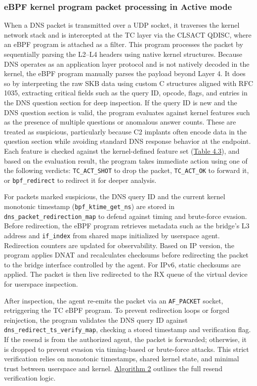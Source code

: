 \documentclass [11pt, proquest] {uwthesis}[2020/02/24]
\begin{document}
\subsubsection{\textbf{eBPF kernel program packet processing in \textbf{Active} mode}}
\label{active:sec1}
When a DNS packet is transmitted over a UDP socket, it traverses the kernel network stack and is intercepted at the TC layer via the CLSACT QDISC, where an eBPF program is attached as a filter. This program processes the packet by sequentially parsing the L2–L4 headers using native kernel structures. Because DNS operates as an application layer protocol and is not natively decoded in the kernel, the eBPF program manually parses the payload beyond Layer 4. It does so by interpreting the raw SKB data using custom C structures aligned with RFC 1035, extracting critical fields such as the query ID, opcode, flags, and entries in the DNS question section for deep inspection.
If the query ID is new and the DNS question section is valid, the program evaluates against kernel features such as the presence of multiple questions or anomalous answer counts. These are treated as suspicious, particularly because C2 implants often encode data in the question section while avoiding standard DNS response behavior at the endpoint. Each feature is checked against the kernel-defined feature set (\hyperref[sec:feature-kernel]{Table 4.3}), and based on the evaluation result, the program takes immediate action using one of the following verdicts: \texttt{TC\_ACT\_SHOT} to drop the packet, \texttt{TC\_ACT\_OK} to forward it, or \texttt{bpf\_redirect} to redirect it for deeper analysis.

For packets marked suspicious, the DNS query ID and the current kernel monotonic timestamp (\texttt{bpf\_ktime\_get\_ns}) are stored in \texttt{dns\_packet\_redirection\_map} to defend against timing and brute-force evasion. Before redirection, the eBPF program retrieves metadata such as the bridge’s L3 address and \texttt{if\_index} from shared maps initialized by userspace agent. Redirection counters are updated for observability. Based on IP version, the program applies DNAT and recalculates checksums before redirecting the packet to the bridge interface controlled by the agent. For IPv6, static checksums are applied. The packet is then live redirected to the RX queue of the virtual device for userspace inspection.

After inspection, the agent re-emits the packet via an \texttt{AF\_PACKET} socket, retriggering the TC eBPF program. To prevent redirection loops or forged reinjection, the program validates the DNS query ID against \texttt{dns\_redirect\_ts\_verify\_map}, checking a stored timestamp and verification flag. If the resend is from the authorized agent, the packet is forwarded; otherwise, it is dropped to prevent evasion via timing-based or brute-force attacks. This strict verification relies on monotonic timestamps, shared kernel state, and minimal trust between userspace and kernel. \hyperref[sec:alg2]{Algorithm 2} outlines the full resend verification logic.
\end{document}
